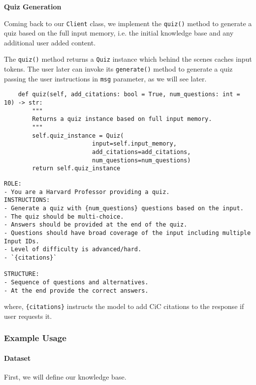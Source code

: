 \textbf{Quiz Generation}

Coming back to our \texttt{Client} class, we implement the \texttt{quiz()} method to generate a quiz based on the full input memory, i.e. the initial knowledge base and any additional user added content.

The \texttt{quiz()} method returns a \texttt{Quiz} instance which behind the scenes caches input tokens. The user later can invoke its \texttt{generate()} method to generate a quiz passing the user instructions in \texttt{msg} parameter, as we will see later.

\begin{verbatim}
    def quiz(self, add_citations: bool = True, num_questions: int = 10) -> str:
        """
        Returns a quiz instance based on full input memory.
        """
        self.quiz_instance = Quiz(
                         input=self.input_memory,
                         add_citations=add_citations,
                         num_questions=num_questions)
        return self.quiz_instance
\end{verbatim}

\begin{verbatim}
ROLE:
- You are a Harvard Professor providing a quiz.
INSTRUCTIONS:
- Generate a quiz with {num_questions} questions based on the input.
- The quiz should be multi-choice.
- Answers should be provided at the end of the quiz.
- Questions should have broad coverage of the input including multiple Input IDs.
- Level of difficulty is advanced/hard.
- `{citations}`

STRUCTURE:
- Sequence of questions and alternatives.
- At the end provide the correct answers.
\end{verbatim}
where, \texttt{\{citations\}} instructs the model to add CiC citations to the response if user requests it.

\subsubsection{Example Usage}

\paragraph{Dataset}

First, we will define our knowledge base. 

